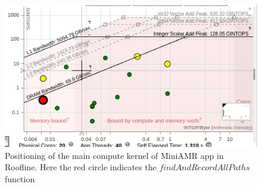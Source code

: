 \begin{figure}[h]%
\begin{center}
\includegraphics[width=1\linewidth]{MEMSYS22/figures/roofline/pathfinder.png}
\end{center}
  \vspace{-0.1in}
\caption{Positioning of the main compute kernel of MiniAMR app in Roofline. Here the red circle indicates the $findAndRecordAllPaths$ function }
\label{fig:roof-pathfinder}
\vspace{-0.2in}
\end{figure}


%
%
%
%  
%
%
%
%








